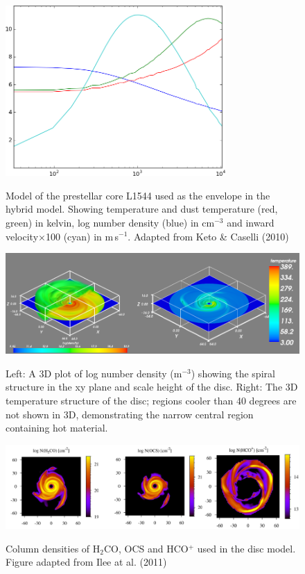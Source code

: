 \documentclass[useAMS,usenatbib]{mn2e}
\begin{document}
\begin{figure}
 \includegraphics[width=84mm]{Figures/model/L1544model_used.png}
 \label{L1544}
 \caption{Model of the prestellar core L1544 used as the envelope in the hybrid model. Showing temperature and dust temperature (red, green) in kelvin, log number density (blue) in cm$^{-3}$ and inward velocity$\times$100 (cyan) in m$\,$s$^{-1}$. Adapted from Keto \& Caselli (2010)}
\end{figure}

\begin{figure}
 \includegraphics[width=168mm]{Figures/model/rhoT2.png}
 \label{rhoT} 
 \caption{Left: A 3D plot of log number density (m$^{-3}$) showing the spiral structure in the xy plane and scale height of the disc. Right: The 3D temperature structure of the disc; regions cooler than 40 degrees are not shown in 3D, demonstrating the narrow central region containing hot material.}
\end{figure}

\begin{figure}
 \includegraphics[width=168mm]{Figures/model/columnDensities2.png}
 \label{Chemistry} 
 \caption{Column densities of H$_2$CO, OCS and HCO$^+$ used in the disc model. Figure adapted from Ilee at al. (2011)}
\end{figure}
\end{document}

